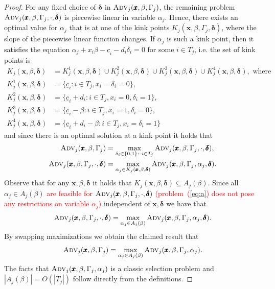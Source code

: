 \begin{proof}
  For any fixed choice of $\pmb{\delta}$ in $\textsc{Adv}_j(\pmb{x},\beta,\Gamma_j)$, the remaining problem $\textsc{Adv}_j(\pmb{x},\beta,\Gamma_j, \cdot, \pmb{\delta})$ is piecewise linear in variable $\alpha_j$.
  Hence, there exists an optimal value for $\alpha_j$ that is at one of the kink points $K_j(\pmb{x}, \beta, \Gamma_j, \pmb{\delta})$, 
  where the slope of the piecewise linear function changes. 
  If $\alpha_j$ is such a kink point, then it satisfies the equation $\alpha_j + x_i \beta - \underline{c}_i - d_i\delta_i = 0$ for some $i \in T_j$,
  i.e. the set of kink points is
  \begin{align*}
  K_j(\pmb{x}, \beta, \pmb{\delta}) &= K_j^1(\pmb{x}, \beta, \pmb{\delta}) \cup K_j^2(\pmb{x}, \beta, \pmb{\delta}) \cup K_j^3(\pmb{x}, \beta, \pmb{\delta}) \cup K_j^4(\pmb{x}, \beta, \pmb{\delta}),\text{ where} \\
  K_j^1(\pmb{x}, \beta, \pmb{\delta}) &= \{\underline{c}_i \colon  i \in T_j, x_i = \delta_i = 0 \}, \\
  K_j^2(\pmb{x}, \beta, \pmb{\delta}) &= \{\underline{c}_i + d_i \colon  i \in T_j, x_i = 0, \delta_i = 1 \}, \\
  K_j^3(\pmb{x}, \beta, \pmb{\delta}) &= \{\underline{c}_i - \beta \colon i \in T_j, x_i = 1, \delta_i = 0 \}, \\
  K_j^4(\pmb{x}, \beta, \pmb{\delta}) &= \{\underline{c}_i +d_i - \beta \colon i \in T_j, x_i = \delta_i = 1 \}
  \end{align*}
  and since there is an optimal solution at a kink point it holds that
\begin{align*}
  \textsc{Adv}_j(\pmb{x},\beta,\Gamma_j) &= \max_{\delta_i \in \{0,1\} \colon i \in T_j} \textsc{Adv}_j(\pmb{x},\beta,\Gamma_j, \cdot, \pmb{\delta}),\\
   \textsc{Adv}_j(\pmb{x},\beta,\Gamma_j, \cdot, \pmb{\delta}) &= \max_{\alpha_j \in K_j(\pmb{x}, \beta, \pmb{\delta})} \textsc{Adv}_j(\pmb{x},\beta,\Gamma_j,\alpha_j, \pmb{\delta}).
\end{align*}
  Observe that for any $\pmb{x}, \beta, \pmb{\delta}$ it holds that $K_j(\pmb{x}, \beta, \pmb{\delta}) \subseteq A_j(\beta)$. 
  Since all $\alpha_j \in A_j(\beta)$ \textcolor{red}{are feasible for $\textsc{Adv}_j(\pmb{x},\beta,\Gamma_j, \cdot, \pmb{\delta})$ (problem~(\ref{eq:a}) does not pose any restrictions on variable $\alpha_j$)}
  independent of 
  $\pmb{x}, \pmb{\delta}$ we have that 
  \[ \textsc{Adv}_j(\pmb{x},\beta,\Gamma_j, \cdot, \pmb{\delta}) = \max_{\alpha_j \in A_j(\beta)} \textsc{Adv}_j(\pmb{x},\beta,\Gamma_j,\alpha_j, \pmb{\delta}). \]
  By swapping maximizations we obtain the claimed result that
  \[ \textsc{Adv}_j(\pmb{x},\beta,\Gamma_j) = \max_{\alpha_j \in A_j(\beta)} \textsc{Adv}_j(\pmb{x},\beta,\Gamma_j,\alpha_j). \]
  The facts that $\textsc{Adv}_j(\pmb{x},\beta,\Gamma_j,\alpha_j)$ is a classic selection problem and 
  $|A_j(\beta)| = O(|T_j|)$ follow directly from the definitions.
\end{proof}

